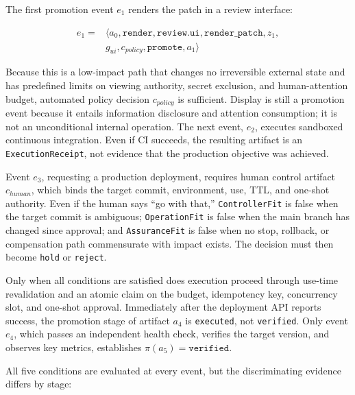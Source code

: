 The first promotion event \(e_1\) renders the patch in a review interface:

\[
\begin{aligned}
e_1={}&\langle a_0,\texttt{render},\texttt{review.ui},\texttt{render\_patch},z_1,\\
&g_{ui},c_{policy},\texttt{promote},a_1\rangle
\end{aligned}
\]

Because this is a low-impact path that changes no irreversible external state and has predefined limits on viewing authority, secret exclusion, and human-attention budget, automated policy decision \(c_{policy}\) is sufficient. Display is still a promotion event because it entails information disclosure and attention consumption; it is not an unconditional internal operation. The next event, \(e_2\), executes sandboxed continuous integration. Even if CI succeeds, the resulting artifact is an \passthrough{\lstinline!ExecutionReceipt!}, not evidence that the production objective was achieved.

Event \(e_3\), requesting a production deployment, requires human control artifact \(c_{human}\), which binds the target commit, environment, use, TTL, and one-shot authority. Even if the human says ``go with that,'' \passthrough{\lstinline!ControllerFit!} is false when the target commit is ambiguous; \passthrough{\lstinline!OperationFit!} is false when the main branch has changed since approval; and \passthrough{\lstinline!AssuranceFit!} is false when no stop, rollback, or compensation path commensurate with impact exists. The decision must then become \passthrough{\lstinline!hold!} or \passthrough{\lstinline!reject!}.

Only when all conditions are satisfied does execution proceed through use-time revalidation and an atomic claim on the budget, idempotency key, concurrency slot, and one-shot approval. Immediately after the deployment API reports success, the promotion stage of artifact \(a_4\) is \passthrough{\lstinline!executed!}, not \passthrough{\lstinline!verified!}. Only event \(e_4\), which passes an independent health check, verifies the target version, and observes key metrics, establishes \(\pi(a_5)=\texttt{verified}\).

All five conditions are evaluated at every event, but the discriminating evidence differs by stage:

